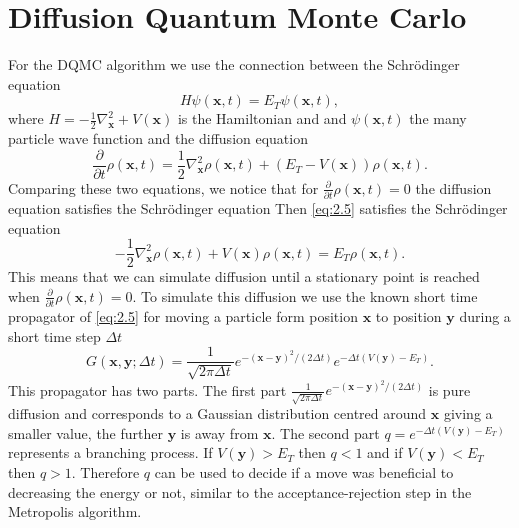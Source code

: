\documentclass [12pt]{report}
\begin{document}
\section{Diffusion Quantum Monte Carlo}
For the DQMC algorithm we use the connection between the Schrödinger equation
\begin{equation}
H \psi(\bm{x},t) = E_T \psi(\bm{x},t),
\end{equation}
where $H = -\frac{1}{2} \nabla^2_{\bm{x}} + V(\bm{x})$ is the Hamiltonian and and $\psi(\bm{x},t)$ the many particle wave function and the diffusion equation 
\begin{equation} \label{eq:2.5}
\frac{\partial}{\partial t} \rho(\bm{x},t) = \frac{1}{2} \nabla^2_{\bm{x}} \rho(\bm{x},t) + (E_T - V(\bm{x}))\rho(\bm{x},t).
\end{equation}
Comparing these two equations, we notice that for $\frac{\partial}{\partial t} \rho(\bm{x},t) = 0$ the diffusion equation satisfies the Schrödinger equation
 Then \eqref{eq:2.5} satisfies the Schrödinger equation
\begin{equation} \label{eq:2.6}
-\frac{1}{2} \nabla^2_{\bm{x}} \rho(\bm{x},t) + V(\bm{x})\rho(\bm{x},t) = E_T \rho(\bm{x},t).
\end{equation}
This means that we can simulate diffusion until a stationary point is reached when $\frac{\partial}{\partial t} \rho(\bm{x},t) = 0$. To simulate this diffusion we use the known short time propagator of \eqref{eq:2.5} for moving a particle form position $\bm{x}$ to position $\bm{y}$ during a short time step $\Delta t$
\begin{equation} \label{eq:2.7}
G(\bm{x},\bm{y};\Delta t) = \frac{1}{\sqrt{2 \pi \Delta t}} e^{-(\bm{x}-\bm{y})^2/(2\Delta t)} e^{-\Delta t (V(\bm{y}) - E_T)}.
\end{equation}
This propagator has two parts. The first part $\frac{1}{\sqrt{2 \pi \Delta t}} e^{-(\bm{x}-\bm{y})^2/(2\Delta t)}$ is pure diffusion and corresponds to a Gaussian distribution centred around $\bm{x}$ giving a smaller value, the further $\bm{y}$ is away from $\bm{x}$. The second part $q = e^{-\Delta t (V(\bm{y}) - E_T)}$ represents a branching process. If $V(\bm{y}) > E_T$ then $q < 1$ and if $V(\bm{y}) < E_T$ then $q > 1$. Therefore $q$ can be used to decide if a move was beneficial to decreasing the energy or not, similar to the acceptance-rejection step in the Metropolis algorithm.\\
\end{document}
